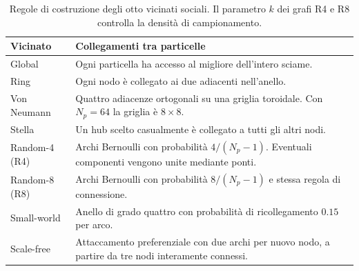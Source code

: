\begin{table}[!tbp]
\centering\small
\caption{Regole di costruzione degli otto vicinati sociali. Il parametro $k$ dei grafi R4 e R8 controlla la densità di campionamento.}
\label{tab:app-graphs}
\begin{tabularx}{\textwidth}{@{}lX@{}}
\toprule
Vicinato & Collegamenti tra particelle \\
\midrule
Global & Ogni particella ha accesso al migliore dell'intero sciame. \\
Ring & Ogni nodo è collegato ai due adiacenti nell'anello. \\
Von Neumann & Quattro adiacenze ortogonali su una griglia toroidale. Con $N_p=64$ la griglia è $8\times 8$. \\
Stella & Un hub scelto casualmente è collegato a tutti gli altri nodi. \\
Random-4 (R4) & Archi Bernoulli con probabilità $4/(N_p-1)$. Eventuali componenti vengono unite mediante ponti. \\
Random-8 (R8) & Archi Bernoulli con probabilità $8/(N_p-1)$ e stessa regola di connessione. \\
Small-world & Anello di grado quattro con probabilità di ricollegamento $0.15$ per arco. \\
Scale-free & Attaccamento preferenziale con due archi per nuovo nodo, a partire da tre nodi interamente connessi. \\
\bottomrule
\end{tabularx}
\end{table}
